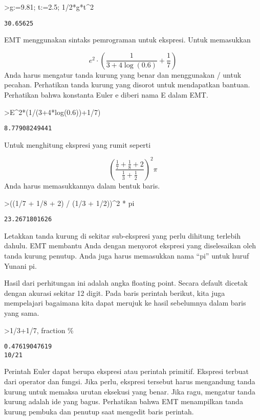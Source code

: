\documentclass[
]{book}
\begin{document}
\textgreater g:=9.81; t:=2.5; 1/2*g*t\^{}2

\begin{verbatim}
30.65625
\end{verbatim}

EMT menggunakan sintaks pemrograman untuk ekspresi. Untuk memasukkan

\[e^2 \cdot \left( \frac{1}{3+4 \log(0.6)}+\frac{1}{7} \right)\]Anda harus mengatur tanda kurung yang benar dan menggunakan / untuk pecahan. Perhatikan tanda kurung yang disorot untuk mendapatkan bantuan. Perhatikan bahwa konstanta Euler e diberi nama E dalam EMT.

\textgreater E\^{}2*(1/(3+4*log(0.6))+1/7)

\begin{verbatim}
8.77908249441
\end{verbatim}

Untuk menghitung ekspresi yang rumit seperti

\[\left(\frac{\frac17 + \frac18 + 2}{\frac13 + \frac12}\right)^2 \pi\]Anda harus memasukkannya dalam bentuk baris.

\textgreater((1/7 + 1/8 + 2) / (1/3 + 1/2))\^{}2 * pi

\begin{verbatim}
23.2671801626
\end{verbatim}

Letakkan tanda kurung di sekitar sub-ekspresi yang perlu dihitung terlebih dahulu. EMT membantu Anda dengan menyorot ekspresi yang diselesaikan oleh tanda kurung penutup. Anda juga harus memasukkan nama ``pi'' untuk huruf Yunani pi.

Hasil dari perhitungan ini adalah angka floating point. Secara default dicetak dengan akurasi sekitar 12 digit. Pada baris perintah berikut, kita juga mempelajari bagaimana kita dapat merujuk ke hasil sebelumnya dalam baris yang sama.

\textgreater1/3+1/7, fraction \%

\begin{verbatim}
0.47619047619
10/21
\end{verbatim}

Perintah Euler dapat berupa ekspresi atau perintah primitif. Ekspresi terbuat dari operator dan fungsi. Jika perlu, ekspresi tersebut harus mengandung tanda kurung untuk memaksa urutan eksekusi yang benar. Jika ragu, mengatur tanda kurung adalah ide yang bagus. Perhatikan bahwa EMT menampilkan tanda kurung pembuka dan penutup saat mengedit baris perintah.
\end{document}

